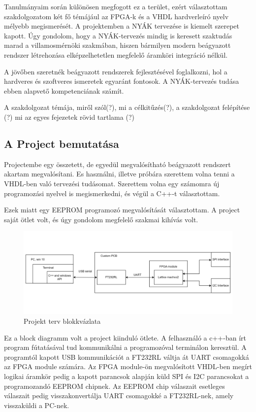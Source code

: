 \documentclass[a4paper,12pt,oneside]{book}
\begin{document}
Tanulmányaim során különösen megfogott ez a terület, ezért választottam szakdolgozatom két fő témájául az FPGA-k és a VHDL hardverleíró nyelv mélyebb megismerését. A projektemben a NYÁK tervezése is kiemelt szerepet kapott. Úgy gondolom, hogy a NYÁK-tervezés mindig is keresett szaktudás marad a villamosmérnöki szakmában, hiszen bármilyen modern beágyazott rendszer létrehozása elképzelhetetlen megfelelő áramköri integráció nélkül. 

A jövőben szeretnék beágyazott rendszerek fejlesztésével foglalkozni, hol a hardveres és szoftveres ismeretek egyaránt fontosok. A NYÁK-tervezés tudása ebben alapvető kompetenciának számít.

A szakdolgozat témája, miről szól(?), mi a célkitűzés(?), a szakdolgozat felépítése (?) mi az egyes fejezetek rövid tartlama (?)
\subsection{A Project bemutatása}
Projectembe egy összetett, de egyedül megvalósítható beágyazott rendszert akartam megvalósítani. Es használni, illetve próbára szerettem volna tenni a VHDL-ben való tervezési tudásomat. Szerettem volna egy számomra új programozási nyelvel is megismerkedni, és végül a C++-t választottam.

Ezek miatt egy EEPROM programozó megvalósítását választottam. A project saját ötlet volt, és úgy gondolom megfelelő szakmai kihívás volt.
\begin{figure}[H]
	\centering
	\includegraphics[trim=1mm 1mm 1mm 1mm,scale=0.245]{terv1.png}
	\caption{Projekt terv blokkvázlata}
	\label{Projekt terv}
\end{figure}
Ez a block diagramm volt a project kiinduló ötlete. A felhasználó a c++-ban írt program fútatásával tud kommunikálni a programozóval terminálon keresztül. A programtól kapott  USB kommunikációt a FT232RL váltja át UART csomagokká az FPGA module számára. Az FPGA module-ön megvalósított VHDL-ben megírt logikai áramkör pedig a kapott parancsok alapján küld SPI és I2C parancsokat a programozandó EEPROM chipnek. Az EEPROM chip válaszait esetleges válaszait pedig visszakonvertálja UART csomagokké a FT232RL-nek, amely visszaküldi a PC-nek.
\end{document}
